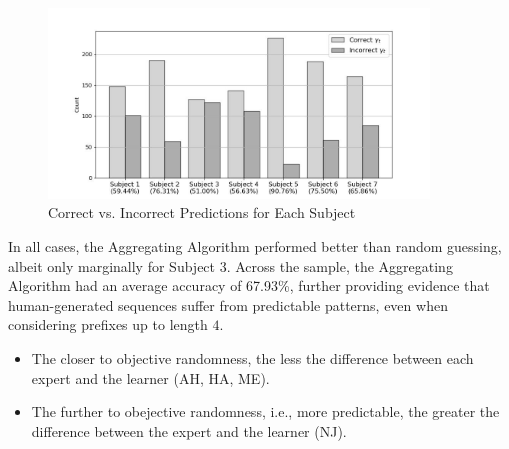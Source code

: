 \begin{figure}[h]
    \centering
    \includegraphics[width=0.9\textwidth]{images/prediction_results.jpg}
    \caption{Correct vs. Incorrect Predictions for Each Subject}
    \label{prediction_results}
\end{figure}

In all cases, the Aggregating Algorithm performed better than random guessing, albeit only marginally for Subject 3. Across the sample, the Aggregating Algorithm had an average accuracy of 67.93\%, further providing evidence that human-generated sequences suffer from predictable patterns, even when considering prefixes up to length $4$.

\begin{itemize}
    \item The closer to objective randomness, the less the difference between each expert and the learner (AH, HA, ME).
    \item The further to obejective randomness, i.e., more predictable, the greater the difference between the expert and the learner (NJ).
\end{itemize}



